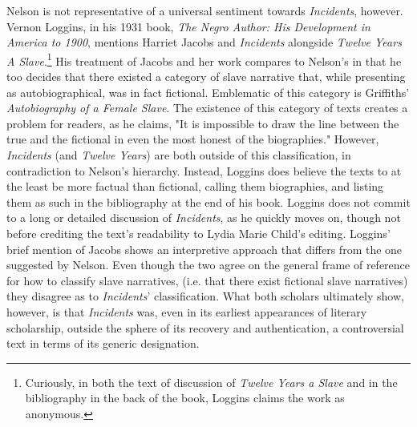 Nelson is not representative of a universal sentiment towards \textit{Incidents}, however. Vernon Loggins, in his 1931 book, \textit{The Negro Author: His Development in America to 1900}, mentions Harriet Jacobs and \textit{Incidents} alongside \textit{Twelve Years A Slave}.\footnote{Curiously, in both the text of discussion of \textit{Twelve Years a Slave} and in the bibliography in the back of the book, Loggins claims the work as anonymous.} His treatment of Jacobs and her work compares to Nelson's in that he too decides that there existed a category of slave narrative that, while presenting as autobiographical, was in fact fictional. Emblematic of this category is Griffiths' \textit{Autobiography of a Female Slave}. The existence of this category of texts creates a problem for readers, as he claims, "It is impossible to draw the line between the true and the fictional in even the most honest of the biographies."\autocite[229]{loggins_negro_1964} However, \textit{Incidents} (and \textit{Twelve Years}) are both outside of this classification, in contradiction to Nelson's hierarchy. Instead, Loggins does believe the texts to at the least be more factual than fictional, calling them biographies, and listing them as such in the bibliography at the end of his book. Loggins does not commit to a long or detailed discussion of \textit{Incidents}, as he quickly moves on, though not before crediting the text's readability to Lydia Marie Child's editing. Loggins' brief mention of Jacobs shows an interpretive approach that differs from the one suggested by Nelson. Even though the two agree on the general frame of reference for how to classify slave narratives, (i.e. that there exist fictional slave narratives) they disagree as to \textit{Incidents}' classification. What both scholars ultimately show, however, is that \textit{Incidents} was, even in its earliest appearances of literary scholarship, outside the sphere of its recovery and authentication, a controversial text in terms of its generic designation. 

